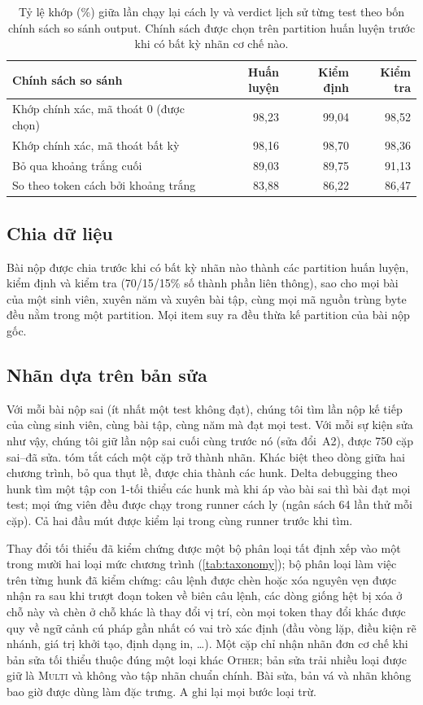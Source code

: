 \documentclass[a4paper,preprint,12pt,authoryear]{elsarticle}
\begin{document}
\begin{table}[t]
\centering
\caption{Tỷ lệ khớp (\%) giữa lần chạy lại cách ly và verdict lịch sử từng test theo bốn chính sách so sánh output. Chính sách được chọn trên partition huấn luyện trước khi có bất kỳ nhãn cơ chế nào.}\label{tab:audit}
\small
\begin{tabular}{lrrr}
\toprule
Chính sách so sánh & Huấn luyện & Kiểm định & Kiểm tra \\
\midrule
Khớp chính xác, mã thoát 0 (được chọn) & 98,23 & 99,04 & 98,52 \\
Khớp chính xác, mã thoát bất kỳ & 98,16 & 98,70 & 98,36 \\
Bỏ qua khoảng trắng cuối & 89,03 & 89,75 & 91,13 \\
So theo token cách bởi khoảng trắng & 83,88 & 86,22 & 86,47 \\
\bottomrule
\end{tabular}
\end{table}

\subsection{Chia dữ liệu}
Bài nộp được chia trước khi có bất kỳ nhãn nào thành các partition huấn luyện, kiểm định và kiểm tra (70/15/15\% số thành phần liên thông), sao cho mọi bài của một sinh viên, xuyên năm và xuyên bài tập, cùng mọi mã nguồn trùng byte đều nằm trong một partition. Mọi item suy ra đều thừa kế partition của bài nộp gốc.

\subsection{Nhãn dựa trên bản sửa}\label{sec:real}
Với mỗi bài nộp sai (ít nhất một test không đạt), chúng tôi tìm lần nộp kế tiếp của cùng sinh viên, cùng bài tập, cùng năm mà đạt mọi test. Với mỗi sự kiện sửa như vậy, chúng tôi giữ lần nộp sai cuối cùng trước nó (sửa đổi~A2), được 750 cặp sai--đã sửa.  tóm tắt cách một cặp trở thành nhãn. Khác biệt theo dòng giữa hai chương trình, bỏ qua thụt lề, được chia thành các hunk. Delta debugging theo hunk \citep{zeller2002ddmin} tìm một tập con 1-tối thiểu các hunk mà khi áp vào bài sai thì bài đạt mọi test; mọi ứng viên đều được chạy trong runner cách ly (ngân sách 64 lần thử mỗi cặp). Cả hai đầu mút được kiểm lại trong cùng runner trước khi tìm.

Thay đổi tối thiểu đã kiểm chứng được một bộ phân loại tất định xếp vào một trong mười hai loại mức chương trình (\cref{tab:taxonomy}); bộ phân loại làm việc trên từng hunk đã kiểm chứng: câu lệnh được chèn hoặc xóa nguyên vẹn được nhận ra sau khi trượt đoạn token về biên câu lệnh, các dòng giống hệt bị xóa ở chỗ này và chèn ở chỗ khác là thay đổi vị trí, còn mọi token thay đổi khác được quy về ngữ cảnh cú pháp gần nhất có vai trò xác định (đầu vòng lặp, điều kiện rẽ nhánh, giá trị khởi tạo, định dạng in, \dots). Một cặp chỉ nhận nhãn đơn cơ chế khi bản sửa tối thiểu thuộc đúng một loại khác \textsc{Other}; bản sửa trải nhiều loại được giữ là \textsc{Multi} và không vào tập nhãn chuẩn chính. Bài sửa, bản vá và nhãn không bao giờ được dùng làm đặc trưng. A ghi lại mọi bước loại trừ.
\end{document}
